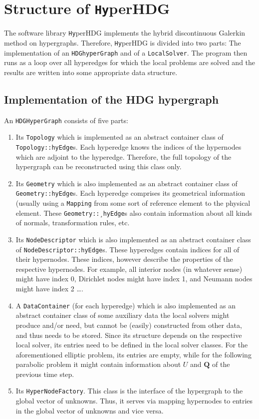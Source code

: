 \documentclass[a4paper, english, 12pt, reqno, draft]{amsart}
\theoremstyle{definition}
\theoremstyle{remark}
\numberwithin{equation}{section}
\newcommand{\hyperHDG}{{\fontfamily{pzc}\selectfont \texttt{Hy}\hspace{-1.5pt}perHDG }}
\renewcommand{\vec}[1]{\ensuremath{\boldsymbol{#1}}}
\newcommand{\code}[1]{\texttt{#1}}
\begin{document}
\section{Structure of \hyperHDG}
% 
The software library \hyperHDG implements the hybrid discontinuous Galerkin method on hypergraphs. Therefore, \hyperHDG is divided into two parts: The implementation of an \code{HDGhyperGraph} and of a \code{LocalSolver}. The program then runs as a loop over all hyperedges for which the local problems are solved and the results are written into some appropriate data structure.
% 
\subsection{Implementation of the HDG hypergraph}
% 
An \code{HDG\-Hyper\-Graph} consists of five parts:
% 
\begin{enumerate}
 \item Its \code{Topology} which is implemented as an abstract container class of \code{Topology::hyEdge}s. Each hyperedge knows the indices of the hypernodes which are adjoint to the hyperedge. Therefore, the full topology of the hypergraph can be reconstructed using this class only.
 \item Its \code{Geometry} which is also implemented as an abstract container class of \code{Geometry::hyEdge}s. Each hyperedge comprises its geometrical information (usually using a \code{Mapping} from some sort of reference element to the physical element. These \code{Geometry::\-¸hyEdge}s also contain information about all kinds of normals, transformation rules, etc.
 \item Its \code{NodeDescriptor} which is also implemented as an abstract container class of \code{NodeDescriptor::hyEdge}s. These hyperedges contain indices for all of their hypernodes. These indices, however describe the properties of the respective hypernodes. For example, all interior nodes (in whatever sense) might have index 0, Dirichlet nodes might have index 1, and Neumann nodes might have index 2 \ldots.
 \item A \code{DataContainer} (for each hyperedge) which is also implemented as an abstract container class of some auxiliary data the local solvers might produce and/or need, but cannot be (easily) constructed from other data, and thus needs to be stored. Since its structure depends on the respective local solver, its entries need to be defined in the local solver classes. For the aforementioned elliptic problem, its entries are empty, while for the following parabolic problem it might contain information about $U$ and $\vec Q$ of the previous time step.
 \item Its \code{HyperNodeFactory}. This class is the interface of the hypergraph to the global vector of unknowns. Thus, it serves via mapping hypernodes to entries in the global vector of unknowns and vice versa.
\end{enumerate}
\end{document}
